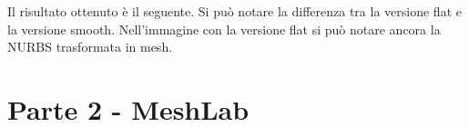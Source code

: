 \newpage

Il risultato ottenuto è il seguente. Si può notare la differenza tra la versione flat e la versione smooth. Nell'immagine con la versione flat si può notare ancora la NURBS trasformata in mesh.\\

\begin{figure}[hbt]%
	\vspace{-1cm}
    \centering
	\vspace{-0.2cm}
\end{figure}



\section{Parte 2 - MeshLab}

